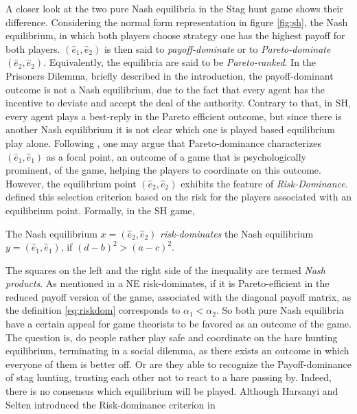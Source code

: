 \documentclass[11pt]{article}
\begin{document}
A closer look at the two pure Nash equilibria in the Stag hunt game 
shows their difference. Considering the normal form representation in figure 
\ref{fig:sh}, the Nash equilibrium, in which both players choose strategy one 
has the highest payoff
for both players. $(\hat{e}_1,\hat{e}_2)$ is then said to 
\textit{payoff-dominate} or to \textit{Pareto-dominate} 
$(\hat{e}_2,\hat{e}_2)$. Equivalently, the equilibria are said to be
\textit{Pareto-ranked}.
In the Prisoners Dilemma, briefly described in the introduction, 
the payoff-dominant outcome is not a 
Nash equilibrium, due to the fact that every agent has the incentive to 
deviate and accept the deal of the authority.
Contrary to that, in SH, every agent plays a best-reply 
in the Pareto efficient outcome, but since there is another Nash equilibrium 
it is not clear which one is played based equilibrium play alone. 
Following \textcite[57]{schelling_strategy_1960}, one may argue that 
Pareto-dominance characterizes $(\hat{e}_1,\hat{e}_1)$ as a focal point, 
an outcome of a game that is psychologically prominent, of 
the game, helping the players to coordinate on this outcome.
However, the equilibrium point $(\hat{e}_2,\hat{e}_2)$ exhibits the feature 
of \textit{Risk-Dominance}. 
\textcite{harsanyi_general_1988} defined this selection criterion 
based on the
risk for the players associated with an equilibrium point. Formally, in the
SH game, 
\begin{mydef}
The Nash equilibrium $x=(\hat{e}_2,\hat{e}_2)$ \textit{risk-dominates} 
the Nash equilibrium $y=(\hat{e}_1,\hat{e}_1)$, if $(d-b)^2 > (a-c)^2$.
         \label{eq:riskdom}
 \end{mydef}
The squares on the left and the right side of the inequality are termed
\textit{Nash products}.
As mentioned in \textcite{weibull_evolutionary_1997} a NE risk-dominates, 
if it is Pareto-efficient  in the reduced payoff version of the game, 
associated with the diagonal
payoff matrix, as the definition \eqref{eq:riskdom} 
corresponds to $\alpha_1 < \alpha_2$.
So both pure Nash equilibria have a certain appeal for game theorists to be
favored as an outcome of the game. The question is, do people rather play
safe and coordinate on the hare hunting equilibrium, terminating in a social
dilemma, as there exists an outcome in which everyone of them is better off.
Or are they able to recognize the Payoff-dominance of stag hunting, 
trusting each other not to react to a hare passing by.
Indeed, there is no consensus which equilibrium will be played. 
Although Harsanyi and Selten introduced the Risk-dominance criterion in 
\end{document}
